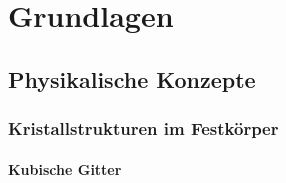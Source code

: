 \chapter{Grundlagen}

\section{Physikalische Konzepte}
    \subsection{Kristallstrukturen im Festkörper}
        \subsubsection{Kubische Gitter}

